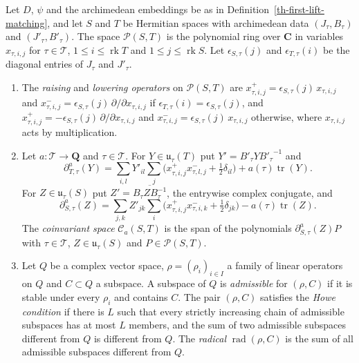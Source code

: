 
\begin{definition}\label{th-square-fock-operators}
Let $D$, $\psi$ and the archimedean embeddings be as in
Definition~\ref{th-first-lift-matching}, and let $S$ and $T$ be Hermitian
spaces with archimedean data $(J_\tau,B_\tau)$ and $(J'_\tau,B'_\tau)$. The
space $\mathcal P(S,T)$ is the polynomial ring over $\mathbf C$ in variables
$x_{\tau,i,j}$ for $\tau\in\mathcal T$, $1\leq i\leq\operatorname{rk}T$ and
$1\leq j\leq\operatorname{rk}S$. Let $\epsilon_{S,\tau}(j)$ and
$\epsilon_{T,\tau}(i)$ be the diagonal entries of $J_\tau$ and $J'_\tau$.
\begin{enumerate}
\item The \emph{raising} and \emph{lowering operators} on $\mathcal P(S,T)$ are
  $x^+_{\tau,i,j}=\epsilon_{S,\tau}(j)\,x_{\tau,i,j}$ and
  $x^-_{\tau,i,j}=\epsilon_{S,\tau}(j)\,\partial/\partial x_{\tau,i,j}$ if
  $\epsilon_{T,\tau}(i)=\epsilon_{S,\tau}(j)$, and
  $x^+_{\tau,i,j}=-\epsilon_{S,\tau}(j)\,\partial/\partial x_{\tau,i,j}$ and
  $x^-_{\tau,i,j}=\epsilon_{S,\tau}(j)\,x_{\tau,i,j}$ otherwise, where
  $x_{\tau,i,j}$ acts by multiplication.
\item Let $a\colon\mathcal T\to\mathbf Q$ and $\tau\in\mathcal T$. For
  $Y\in\mathfrak u_\tau(T)$ put $Y'=B'_\tau Y{B'_\tau}^{-1}$ and
  \[
  \partial^a_{T,\tau}(Y)=\sum_{i,l}Y'_{il}\sum_j\bigl(x^+_{\tau,i,j}x^-_{\tau,l,j}+\tfrac12\delta_{il}\bigr)+a(\tau)\operatorname{tr}(Y).
  \]
  For $Z\in\mathfrak u_\tau(S)$ put $Z'=\overline{B_\tau ZB_\tau^{-1}}$, the
  entrywise complex conjugate, and
  \[
  \partial^a_{S,\tau}(Z)=\sum_{j,k}Z'_{jk}\sum_i\bigl(x^+_{\tau,i,j}x^-_{\tau,i,k}+\tfrac12\delta_{jk}\bigr)-a(\tau)\operatorname{tr}(Z).
  \]
  The \emph{coinvariant space} $\mathcal C_a(S,T)$ is the span of the
  polynomials $\partial^a_{S,\tau}(Z)P$ with $\tau\in\mathcal T$,
  $Z\in\mathfrak u_\tau(S)$ and $P\in\mathcal P(S,T)$.
\item Let $Q$ be a complex vector space, $\rho=(\rho_i)_{i\in I}$ a family of
  linear operators on $Q$ and $C\subset Q$ a subspace. A subspace of $Q$ is
  \emph{admissible} for $(\rho,C)$ if it is stable under every $\rho_i$ and
  contains $C$. The pair $(\rho,C)$ satisfies the \emph{Howe condition} if
  there is $L$ such that every strictly increasing chain of admissible
  subspaces has at most $L$ members, and the sum of two admissible subspaces
  different from $Q$ is different from $Q$. The \emph{radical}
  $\operatorname{rad}(\rho,C)$ is the sum of all admissible subspaces
  different from $Q$.
\end{enumerate}
\end{definition}

